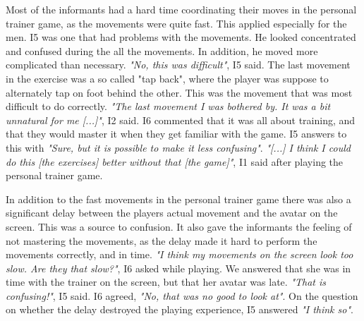 Most of the informants had a hard time coordinating their moves in the personal trainer game, as the movements were quite fast. This applied especially for the men. I5 was one that had problems with the movements. He looked concentrated and confused during the all the movements. In addition, he moved more complicated than necessary. \emph{"No, this was difficult"}, I5 said. The last movement in the exercise was a so called "tap back", where the player was suppose to alternately tap on foot behind the other. This was the movement that was most difficult to do correctly. \emph{"The last movement I was bothered by. It was a bit unnatural for me [...]"}, I2 said. I6 commented that it was all about training, and that they would master it when they get familiar with the game. I5 answers to this with \emph{"Sure, but it is possible to make it less confusing"}. \emph{"[...] I think I could do this [the exercises] better without that [the game]"}, I1 said after playing the personal trainer game. 

In addition to the fast movements in the personal trainer game there was also a significant delay between the players actual movement and the avatar on the screen. This was a source to confusion. It also gave the informants the feeling of not mastering the movements, as the delay made it hard to perform the movements correctly, and in time. \emph{"I think my movements on the screen look too slow. Are they that slow?"}, I6 asked while playing. We answered that she was in time with the trainer on the screen, but that her avatar was late. \emph{"That is confusing!"}, I5 said. I6 agreed, \emph{"No, that was no good to look at"}. On the question on whether the delay destroyed the playing experience, I5 answered \emph{"I think so"}. 

